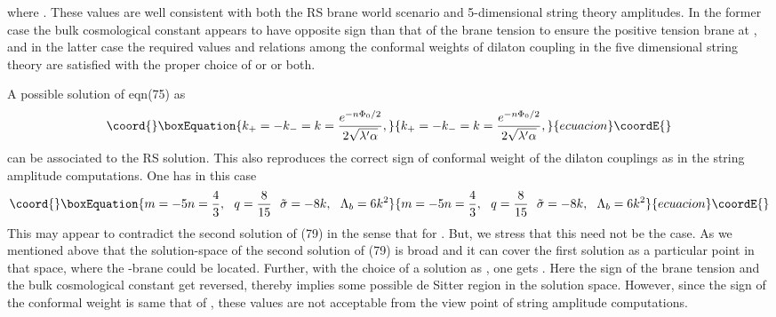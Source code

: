 \documentclass[a4paper,12pt]{article}
\begin{document}
where \coordHE{}. These values are well consistent with both the 
RS brane world scenario and 5-dimensional string theory amplitudes. In the 
former case the bulk cosmological constant \coordHE{} appears to 
have opposite sign than that of the brane tension \coordHE{} 
to ensure the positive tension brane at \coordHE{}, and in the latter case the 
required values and relations among the conformal weights of dilaton coupling 
in the five dimensional string theory are satisfied with the proper choice of 
\coordHE{} or \myHighlight{$\alpha$}\coordHE{} or both. 

A possible solution of eqn(75) as 
\begin{equation}\coord{}\boxEquation{
k_+=-k_-=k=\frac{e^{-n\Phi_0/2}}{2\sqrt{\lambda'\alpha}}, 
}{
k_+=-k_-=k=\frac{e^{-n\Phi_0/2}}{2\sqrt{\lambda'\alpha}}, 
}{ecuacion}\coordE{}\end{equation}
can be associated to the RS solution. This also reproduces 
the correct sign of conformal weight of the dilaton couplings as in the 
string amplitude computations. One has in this case 
\begin{equation}\coord{}\boxEquation{
m=-5n=\frac{4}{3}, ~~  q=\frac{8}{15}~~ \tilde{\sigma}
=-8k,~~\Lambda_b=6k^2 
}{
m=-5n=\frac{4}{3}, ~~  q=\frac{8}{15}~~ \tilde{\sigma}
=-8k,~~\Lambda_b=6k^2 
}{ecuacion}\coordE{}\end{equation}           
This may appear to contradict the second solution of (79) in the sense 
that \coordHE{} for \coordHE{}. But, 
we stress that this need not be the case. As we mentioned 
above that the solution-space of the second solution of (79) is broad and it 
can cover the first solution as a particular point in that space, where the 
\coordHE{}-brane could be located. Further, with the choice of a solution as  
\coordHE{}, one gets  
\coordHE{}. 
Here the sign of the brane tension and the bulk cosmological constant get 
reversed, thereby implies some possible de Sitter region in the solution 
space. However, since the sign of the conformal weight \coordHE{} is same that of 
\coordHE{}, these values are not acceptable from the view point of string 
amplitude computations.        
\end{document}
